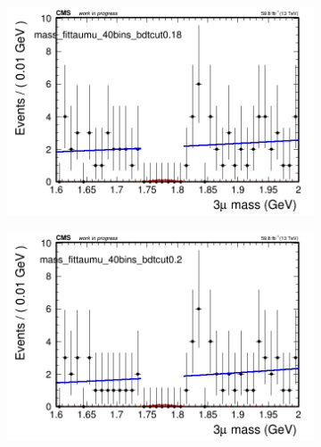 \begin{figure}[H]
\begin{subfigure}{0.2\textwidth}
        \caption{}
    \end{subfigure}
    \begin{subfigure}{0.2\textwidth}
        \includegraphics[width=\textwidth]{unfixed_exp/plots/taumu/massfit_taumu_40bins_bdtcut0.18.png}
        \caption{}
    \end{subfigure}
    \begin{subfigure}{0.2\textwidth}
        \includegraphics[width=\textwidth]{unfixed_exp/plots/taumu/massfit_taumu_40bins_bdtcut0.2.png}
        \caption{}
    \end{subfigure}
    \begin{subfigure}{0.2\textwidth}

\end{subfigure}
\end{figure}
